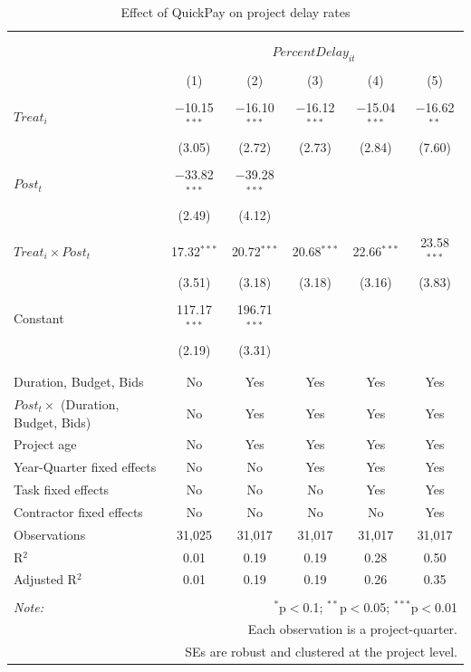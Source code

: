 \documentclass[
]{article}
\begin{document}
\begin{table}[H] \centering 
  \caption{Effect of QuickPay on project delay rates} 
  \label{} 
\small 
\begin{tabular}{@{\extracolsep{-2pt}}lccccc} 
\\[-1.8ex]\hline 
\hline \\[-1.8ex] 
\\[-1.8ex] & \multicolumn{5}{c}{$PercentDelay_{it}$} \\ 
\\[-1.8ex] & (1) & (2) & (3) & (4) & (5)\\ 
\hline \\[-1.8ex] 
 $Treat_i$ & $-$10.15$^{***}$ & $-$16.10$^{***}$ & $-$16.12$^{***}$ & $-$15.04$^{***}$ & $-$16.62$^{**}$ \\ 
  & (3.05) & (2.72) & (2.73) & (2.84) & (7.60) \\ 
  & & & & & \\ 
 $Post_t$ & $-$33.82$^{***}$ & $-$39.28$^{***}$ &  &  &  \\ 
  & (2.49) & (4.12) &  &  &  \\ 
  & & & & & \\ 
 $Treat_i \times Post_t$ & 17.32$^{***}$ & 20.72$^{***}$ & 20.68$^{***}$ & 22.66$^{***}$ & 23.58$^{***}$ \\ 
  & (3.51) & (3.18) & (3.18) & (3.16) & (3.83) \\ 
  & & & & & \\ 
 Constant & 117.17$^{***}$ & 196.71$^{***}$ &  &  &  \\ 
  & (2.19) & (3.31) &  &  &  \\ 
  & & & & & \\ 
\hline \\[-1.8ex] 
Duration, Budget, Bids & No & Yes & Yes & Yes & Yes \\ 
$Post_t \times$  (Duration, Budget, Bids) & No & Yes & Yes & Yes & Yes \\ 
Project age & No & Yes & Yes & Yes & Yes \\ 
Year-Quarter fixed effects & No & No & Yes & Yes & Yes \\ 
Task fixed effects & No & No & No & Yes & Yes \\ 
Contractor fixed effects & No & No & No & No & Yes \\ 
Observations & 31,025 & 31,017 & 31,017 & 31,017 & 31,017 \\ 
R$^{2}$ & 0.01 & 0.19 & 0.19 & 0.28 & 0.50 \\ 
Adjusted R$^{2}$ & 0.01 & 0.19 & 0.19 & 0.26 & 0.35 \\ 
\hline 
\hline \\[-1.8ex] 
\textit{Note:}  & \multicolumn{5}{r}{$^{*}$p$<$0.1; $^{**}$p$<$0.05; $^{***}$p$<$0.01} \\ 
 & \multicolumn{5}{r}{Each observation is a project-quarter.} \\ 
 & \multicolumn{5}{r}{SEs are robust and clustered at the project level.} \\ 
\end{tabular} 
\end{table}
\end{document}
